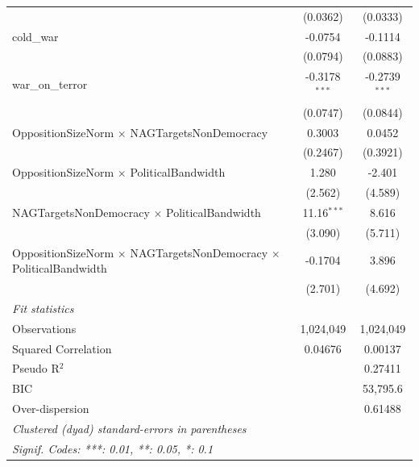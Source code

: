 \begin{tabular}{lcc}
                                                                                    & (0.0362)             & (0.0333)\\   
   cold\_war                                                                        & -0.0754              & -0.1114\\   
                                                                                    & (0.0794)             & (0.0883)\\   
   war\_on\_terror                                                                  & -0.3178$^{***}$      & -0.2739$^{***}$\\   
                                                                                    & (0.0747)             & (0.0844)\\   
   OppositionSizeNorm $\times$ NAGTargetsNonDemocracy                               & 0.3003               & 0.0452\\   
                                                                                    & (0.2467)             & (0.3921)\\   
   OppositionSizeNorm $\times$ PoliticalBandwidth                                   & 1.280                & -2.401\\   
                                                                                    & (2.562)              & (4.589)\\   
   NAGTargetsNonDemocracy $\times$ PoliticalBandwidth                               & 11.16$^{***}$        & 8.616\\   
                                                                                    & (3.090)              & (5.711)\\   
   OppositionSizeNorm $\times$ NAGTargetsNonDemocracy $\times$ PoliticalBandwidth   & -0.1704              & 3.896\\   
                                                                                    & (2.701)              & (4.692)\\   
   \midrule
   \emph{Fit statistics}\\
   Observations                                                                     & 1,024,049            & 1,024,049\\  
   Squared Correlation                                                              & 0.04676              & 0.00137\\  
   Pseudo R$^2$                                                                     &                      & 0.27411\\  
   BIC                                                                              &                      & 53,795.6\\  
   Over-dispersion                                                                  &                      & 0.61488\\  
   \midrule \midrule
   \multicolumn{3}{l}{\emph{Clustered (dyad) standard-errors in parentheses}}\\
   \multicolumn{3}{l}{\emph{Signif. Codes: ***: 0.01, **: 0.05, *: 0.1}}\\
\end{tabular}
\par\endgroup


